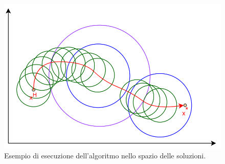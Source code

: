 \begin{figure}[H] 
\begin{center} 
  \includegraphics[scale=0.38]{Images/local_exe}
  \caption{\footnotesize{Esempio di esecuzione dell'algoritmo nello spazio delle soluzioni.}} \label{local_exe} 
\end{center} 
\end{figure}